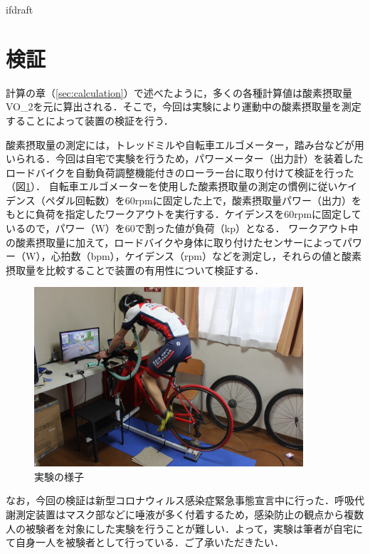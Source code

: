 \expandafter\ifx\csname ifdraft\endcsname\relax
 
\fi

\section{検証}

計算の章（\ref{sec:calculation}）で述べたように，多くの各種計算値は酸素摂取量VO_2を元に算出される．そこで，今回は実験により運動中の酸素摂取量を測定することによって装置の検証を行う．

酸素摂取量の測定には，トレッドミルや自転車エルゴメーター，踏み台などが用いられる．今回は自宅で実験を行うため，パワーメーター（出力計）を装着したロードバイクを自動負荷調整機能付きのローラー台に取り付けて検証を行った（図\ref{fig:bike_in_use}）．
自転車エルゴメーターを使用した酸素摂取量の測定の慣例に従いケイデンス（ペダル回転数）を60rpmに固定した上で，酸素摂取量パワー（出力）をもとに負荷を指定したワークアウトを実行する．ケイデンスを60rpmに固定しているので，パワー（W）を60で割った値が負荷（kp）となる．
ワークアウト中の酸素摂取量に加えて，ロードバイクや身体に取り付けたセンサーによってパワー（W），心拍数（bpm），ケイデンス（rpm）などを測定し，それらの値と酸素摂取量を比較することで装置の有用性について検証する．

\begin{figure}[H]
  \begin{center}
    \includegraphics[width=10cm]{fig/bike_in_use}
    \caption{実験の様子}
    \label{fig:bike_in_use}
  \end{center}
\end{figure}

なお，今回の検証は新型コロナウィルス感染症緊急事態宣言中に行った．呼吸代謝測定装置はマスク部などに唾液が多く付着するため，感染防止の観点から複数人の被験者を対象にした実験を行うことが難しい．よって，実験は筆者が自宅にて自身一人を被験者として行っている．ご了承いただきたい．

